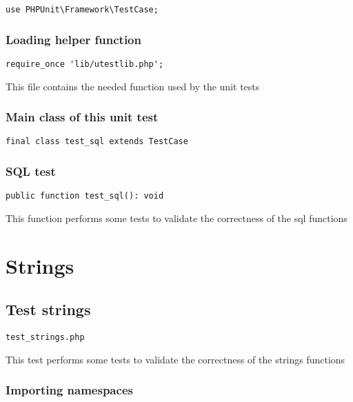 \documentclass[a4paper]{article}
\begin{document}
\begin{lstlisting}
use PHPUnit\Framework\TestCase;
\end{lstlisting}

\hypertarget{toc370}{}
\subsubsection{Loading helper function}

\begin{lstlisting}
require_once 'lib/utestlib.php';
\end{lstlisting}

This file contains the needed function used by the unit tests

\hypertarget{toc371}{}
\subsubsection{Main class of this unit test}

\begin{lstlisting}
final class test_sql extends TestCase
\end{lstlisting}

\hypertarget{toc372}{}
\subsubsection{SQL test}

\begin{lstlisting}
public function test_sql(): void
\end{lstlisting}

This function performs some tests to validate the correctness
of the sql functions


\hypertarget{toc373}{}
\section{Strings}

\hypertarget{toc374}{}
\subsection{Test strings}

\begin{lstlisting}
test_strings.php
\end{lstlisting}

This test performs some tests to validate the correctness
of the strings functions

\hypertarget{toc375}{}
\subsubsection{Importing namespaces}
\end{document}
